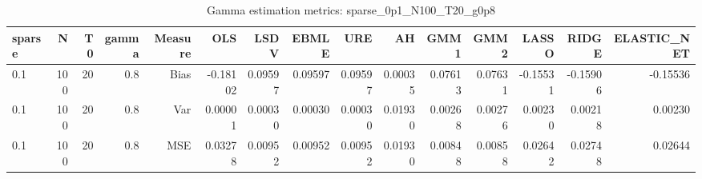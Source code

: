 \begin{table}[!htbp]\centering
\caption{Gamma estimation metrics: sparse_0p1_N100_T20_g0p8}
\label{tab:table1_sparse_0p1_N100_T20_g0p8}
\begin{tabular}{lrrrrrrrrrrrrrr}
\hline
sparse & N & T0 & gamma & Measure & OLS & LSDV & EBMLE & URE & AH & GMM1 & GMM2 & LASSO & RIDGE & ELASTIC_NET \\
\hline
0.1 & 100 & 20 & 0.8 & Bias & -0.18102 & 0.09597 & 0.09597 & 0.09597 & 0.00035 & 0.07613 & 0.07631 & -0.15531 & -0.15906 & -0.15536 \\
0.1 & 100 & 20 & 0.8 & Var & 0.00001 & 0.00030 & 0.00030 & 0.00030 & 0.01930 & 0.00268 & 0.00276 & 0.00230 & 0.00218 & 0.00230 \\
0.1 & 100 & 20 & 0.8 & MSE & 0.03278 & 0.00952 & 0.00952 & 0.00952 & 0.01930 & 0.00848 & 0.00858 & 0.02642 & 0.02748 & 0.02644 \\
\hline
\end{tabular}
\end{table}


